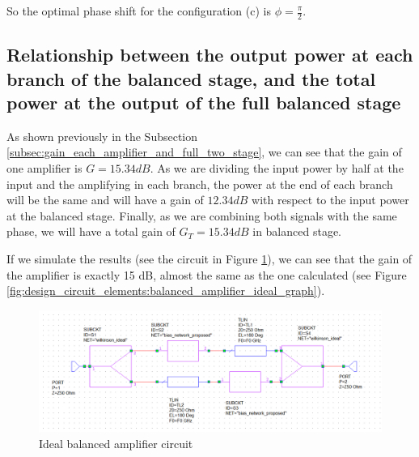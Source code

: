 \documentclass[12pt]{report} %
\begin{document}
So the optimal phase shift for the configuration (c) is $\phi = \frac{\pi}{2}$.

\subsection{Relationship between the output power at each branch of the balanced stage, and the total power at the output of the full balanced stage}

As shown previously in the Subsection \ref{subsec:gain_each_amplifier_and_full_two_stage}, we can see that the gain of one amplifier is $G = 15.34 dB$. As we are dividing the input power by half at the input and the amplifying in each branch, the power at the end of each branch will be the same and will have a gain of $12.34 dB$ with respect to the input power at the balanced stage. Finally, as we are combining both signals with the same phase, we will have a total gain of $G_T = 15.34 dB$ in balanced stage.

If we simulate the results (see the circuit in Figure \ref{fig:design_circuit_elements:balanced_amplifier_ideal_circuit}), we can see that the gain of the amplifier is exactly 15 dB, almost the same as the one calculated (see Figure \ref{fig:design_circuit_elements:balanced_amplifier_ideal_graph}).

\begin{figure}[htbp]
    \centering
    \includegraphics[width=1\linewidth]{images//design_circuit_elements/balanced_amplifier_ideal_circuit.png}
    \caption{Ideal balanced amplifier circuit}
    \label{fig:design_circuit_elements:balanced_amplifier_ideal_circuit}
\end{figure}
\end{document}
